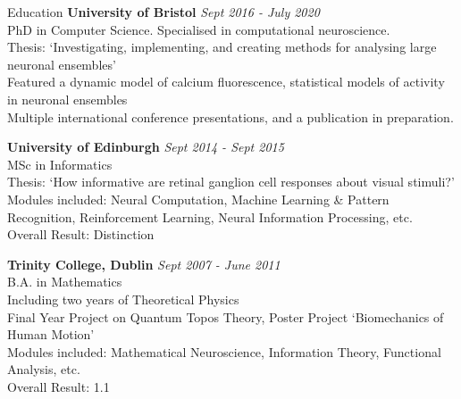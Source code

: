 \documentclass{resume} %
\begin{document}

\begin{rSection}{Education}
{\bf University of Bristol} \hfill {\em Sept 2016 - July 2020} \\
PhD in Computer Science. Specialised in computational neuroscience. \\
Thesis: `Investigating, implementing, and creating methods for analysing large neuronal ensembles' \\
Featured a dynamic model of calcium fluorescence, statistical models of activity in neuronal ensembles \\
Multiple international conference presentations, and a publication in preparation.

{\bf University of Edinburgh} \hfill {\em Sept 2014 - Sept 2015} \\
MSc in Informatics \\
Thesis: `How informative are retinal ganglion cell responses about visual stimuli?' \\
Modules included: Neural Computation, Machine Learning \& Pattern Recognition, Reinforcement Learning, Neural Information Processing, etc.  \smallskip \\
Overall Result: Distinction

{\bf Trinity College, Dublin} \hfill {\em Sept 2007 - June 2011} \\
B.A. in Mathematics \\
Including two years of Theoretical Physics \\
Final Year Project on Quantum Topos Theory, Poster Project `Biomechanics of Human Motion' \\
Modules included: Mathematical Neuroscience, Information Theory, Functional Analysis, etc. \smallskip \\
Overall Result: 1.1

\end{rSection}

\end{document}
